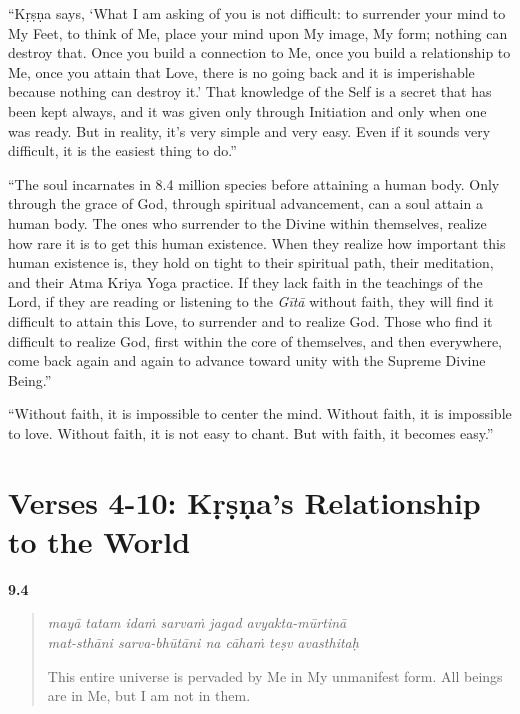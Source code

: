 \enquote{Kṛṣṇa says, \enquote{What I am asking of you is not difficult: to surrender your mind to My Feet, to think of Me, place your mind upon My image, My form; nothing can destroy that. Once you build a connection to Me, once you build a relationship to Me, once you attain that Love, there is no going back and it is imperishable because nothing can destroy it.} That knowledge of the Self is a secret that has been kept always, and it was given only through Initiation and only when one was ready. But in reality, it’s very simple and very easy. Even if it sounds very difficult, it is the easiest thing to do.}

\enquote{The soul incarnates in 8.4 million species before attaining a human body. Only through the grace of God, through spiritual advancement, can a soul attain a human body. The ones who surrender to the Divine within themselves, realize how rare it is to get this human existence. When they realize how important this human existence is, they hold on tight to their spiritual path, their meditation, and their Atma Kriya Yoga practice. If they lack faith in the teachings of the Lord, if they are reading or listening to the \textit{Gītā} without faith, they will find it difficult to attain this Love, to surrender and to realize God. Those who find it difficult to realize God, first within the core of themselves, and then everywhere, come back again and again to advance toward unity with the Supreme Divine Being.}

\enquote{Without faith, it is impossible to center the mind. Without faith, it is impossible to love. Without faith, it is not easy to chant. But with faith, it becomes easy.}

\section{Verses 4-10: Kṛṣṇa's Relationship to the World}\label{sec-verses-4-10-krsna-s-relationship-to-the-world}


\par\noindent\textbf{9.4}\par
\begin{verse}
\textit{mayā tatam idaṁ sarvaṁ jagad avyakta-mūrtinā} \\
\textit{mat-sthāni sarva-bhūtāni na cāhaṁ teṣv avasthitaḥ}

\noindent This entire universe is pervaded by Me in My unmanifest form. All beings are in Me, but I am not in them.
\end{verse}
\par



